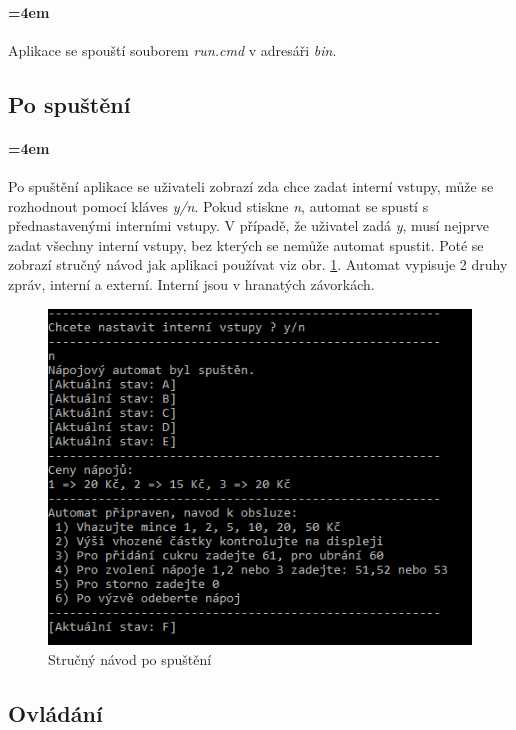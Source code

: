\documentclass[12pt,a4paper]{article}
\begin{document}
\paragraph{\parindent=4em}{	
	Aplikace se spouští souborem {\it run.cmd} v adresáři {\it bin}.
}

\subsection{Po spuštění}

\paragraph{\parindent=4em}{	
	Po spuštění aplikace se uživateli zobrazí zda chce zadat interní vstupy, může se rozhodnout pomocí kláves {\it y/n}. Pokud stiskne {\it n}, automat se spustí s přednastavenými interními vstupy. V případě, že uživatel zadá {\it y}, musí nejprve zadat všechny interní vstupy, bez kterých se nemůže automat spustit. Poté se zobrazí stručný návod jak aplikaci používat viz obr. \ref{fig:pospusteni}. Automat vypisuje 2 druhy zpráv, interní a externí. Interní jsou v hranatých závorkách.
}

\begin{figure}[H]	
	\centering
	\includegraphics[width=\textwidth]{images/spusteni}
	\caption{Stručný návod po spuštění}
	\label{fig:pospusteni}
\end{figure}

\subsection{Ovládání}
\end{document}
